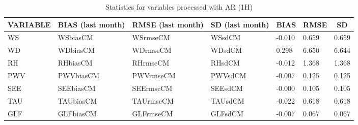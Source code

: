 \documentclass[11pt,english]{article}
\begin{document}
\begin{table}[]
\begin{center}
\begin{tabular}{|l|l|l|l|l|l|l|}
\hline
\multicolumn{1}{|c|}{\cellcolor[HTML]{C0C0C0}\textbf{VARIABLE}} & \multicolumn{1}{c|}{\cellcolor[HTML]{C0C0C0}\textbf{BIAS} (last month)} & \multicolumn{1}{c|}{\cellcolor[HTML]{C0C0C0}\textbf{RMSE} (last month)} & \multicolumn{1}{c|}{\cellcolor[HTML]{C0C0C0}\textbf{SD} (last month)} & \multicolumn{1}{c|}{\cellcolor[HTML]{C0C0C0}\textbf{BIAS}} & \multicolumn{1}{c|}{\cellcolor[HTML]{C0C0C0}\textbf{RMSE}} & \multicolumn{1}{c|}{\cellcolor[HTML]{C0C0C0}\textbf{SD}}\\\hline
\cellcolor[HTML]{C0C0C0}WS  & WSbiasCM     & WSrmseCM     & WSsdCM  &    -0.010  &     0.659  &     0.659 \\
\cellcolor[HTML]{C0C0C0}WD  & WDbiasCM     & WDrmseCM     & WDsdCM  &     0.298  &     6.650  &     6.644 \\
\cellcolor[HTML]{C0C0C0}RH  & RHbiasCM     & RHrmseCM     & RHsdCM  &    -0.012  &     1.368  &     1.368 \\
\cellcolor[HTML]{C0C0C0}PWV & PWVbiasCM    & PWVrmseCM    & PWVsdCM &    -0.007 &     0.125 &     0.125 \\
\cellcolor[HTML]{C0C0C0}SEE & SEEbiasCM    & SEErmseCM    & SEEsdCM &    -0.000 &     0.105 &     0.105 \\
\cellcolor[HTML]{C0C0C0}TAU & TAUbiasCM    & TAUrmseCM    & TAUsdCM &    -0.022 &     0.618 &     0.618 \\
\cellcolor[HTML]{C0C0C0}GLF & GLFbiasCM    & GLFrmseCM    & GLFsdCM &    -0.007 &     0.067 &     0.067 \\
\hline
\end{tabular}
\caption{Statistics for variables processed with AR (1H)}
\end{center}
\end{table}

\newpage
\end{document}

